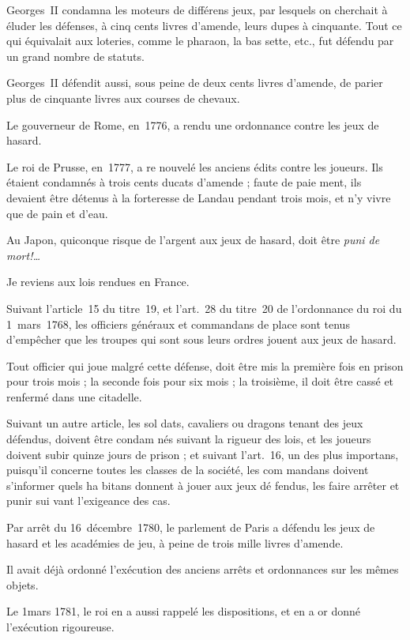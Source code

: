 Georges~II condamna les moteurs
de différens jeux, par lesquels on
cherchait à éluder les défenses, à cinq
cents livres d'amende, leurs dupes à 
cinquante. Tout ce qui équivalait aux
loteries, comme le pharaon, la bas%
sette, etc., fut défendu par un grand
nombre de statuts.

Georges~II défendit aussi, sous peine
de deux cents livres d'amende, de
parier plus de cinquante livres aux
courses de chevaux.

Le gouverneur de Rome, en~1776,
a rendu une ordonnance contre les
jeux de hasard.

Le roi de Prusse, en~1777, a re%
nouvelé les anciens édits contre les
joueurs. Ils étaient condamnés à trois
cents ducats d'amende ; faute de paie%
ment, ils devaient être détenus à la
forteresse de Landau pendant trois
mois, et n'y vivre que de pain et d'eau.

Au Japon, quiconque risque de
l'argent aux jeux de hasard, doit être
\emph{puni de mort!\ldots}

Je reviens aux lois rendues en
France.

Suivant l'article~15 du titre~19, et
l'art.~28 du titre~20 de l'ordonnance
du roi du 1\ier~mars~1768, les officiers
généraux et commandans de place
sont tenus d'empêcher que les troupes
qui sont sous leurs ordres jouent aux
jeux de hasard.

Tout officier qui joue malgré cette
défense, doit être mis la première fois
en prison pour trois mois ; la seconde
fois pour six mois ; la troisième, il
doit être cassé et renfermé dans une
citadelle.

Suivant un autre article, les sol%
dats, cavaliers ou dragons tenant des
jeux défendus, doivent être condam%
nés suivant la rigueur des lois, et les
joueurs doivent subir quinze jours
de prison ; et suivant l'art.~16, un des
plus importans, puisqu'il concerne
toutes les classes de la société, les com%
mandans doivent s'informer quels ha%
bitans donnent à jouer aux jeux dé%
fendus, les faire arrêter et punir sui%
vant l'exigeance des cas.

Par arrêt du 16~décembre~1780,
le parlement de Paris a défendu les
jeux de hasard et les académies de jeu,
à peine de trois mille livres d'amende.

Il avait déjà ordonné l'exécution
des anciens arrêts et ordonnances sur
les mêmes objets.

Le 1\ier mars 1781, le roi en a aussi
rappelé les dispositions, et en a or%
donné l'exécution rigoureuse.

